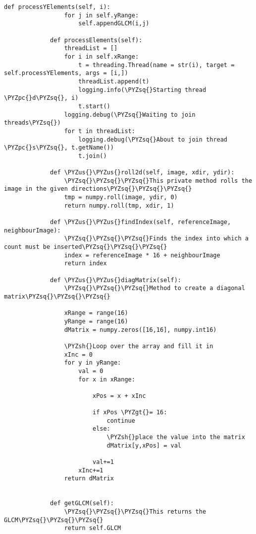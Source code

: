\documentclass[11pt]{article}
\def\PYZsq{\textquotesingle}%
\def\PYZus{\char`\_}
\def\PYZgt{\char`\>}
\def\PYZsh{\char`\#}
\def\PYZpc{\char`\%}
\def\PYZsq{\char`\'}
\begin{document}
\begin{Verbatim}[commandchars=\\\{\}]
             def processYElements(self, i):
                 for j in self.yRange:
                     self.appendGLCM(i,j)            
                     
             def processElements(self):
                 threadList = []
                 for i in self.xRange:
                     t = threading.Thread(name = str(i), target = self.processYElements, args = [i,])
                     threadList.append(t)
                     logging.info(\PYZsq{}Starting thread \PYZpc{}d\PYZsq{}, i)
                     t.start()
                 logging.debug(\PYZsq{}Waiting to join threads\PYZsq{})
                 for t in threadList:
                     logging.debug(\PYZsq{}About to join thread \PYZpc{}s\PYZsq{}, t.getName())
                     t.join()
                    
             def \PYZus{}\PYZus{}roll2d(self, image, xdir, ydir):
                 \PYZsq{}\PYZsq{}\PYZsq{}This private method rolls the image in the given directions\PYZsq{}\PYZsq{}\PYZsq{}
                 tmp = numpy.roll(image, ydir, 0)
                 return numpy.roll(tmp, xdir, 1)  
             
             def \PYZus{}\PYZus{}findIndex(self, referenceImage, neighbourImage):
                 \PYZsq{}\PYZsq{}\PYZsq{}Finds the index into which a count must be inserted\PYZsq{}\PYZsq{}\PYZsq{}
                 index = referenceImage * 16 + neighbourImage
                 return index
         
             def \PYZus{}\PYZus{}diagMatrix(self):
                 \PYZsq{}\PYZsq{}\PYZsq{}Method to create a diagonal matrix\PYZsq{}\PYZsq{}\PYZsq{}
                 
                 xRange = range(16)
                 yRange = range(16)
                 dMatrix = numpy.zeros([16,16], numpy.int16)
                 
                 \PYZsh{}Loop over the array and fill it in
                 xInc = 0
                 for y in yRange:
                     val = 0
                     for x in xRange:
                         
                         xPos = x + xInc
                         
                         if xPos \PYZgt{}= 16:
                             continue
                         else:
                             \PYZsh{}place the value into the matrix
                             dMatrix[y,xPos] = val
                         
                         val+=1   
                     xInc+=1
                 return dMatrix
                 
                      
             def getGLCM(self):
                 \PYZsq{}\PYZsq{}\PYZsq{}This returns the GLCM\PYZsq{}\PYZsq{}\PYZsq{}
                 return self.GLCM
             
\end{Verbatim}
\end{document}
